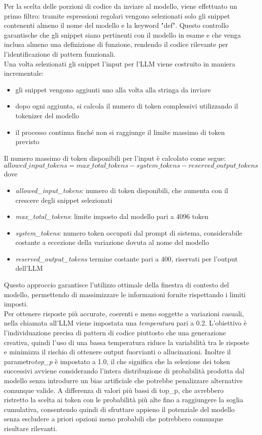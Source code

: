 \documentclass{article}
\begin{document}
Per la scelta delle porzioni di codice da inviare al modello, viene effettuato un primo filtro: tramite espressioni regolari vengono selezionati solo gli snippet contenenti almeno il nome del modello e la keyword "def". Questo controllo garantische che gli snippet siano pertinenti con il modello in esame e che venga inclusa almeno una definizione di funzione, rendendo il codice rilevante per l'identificazione di pattern funzionali.\\
Una volta selezionati gli snippet l'input per l'LLM viene costruito in maniera incrementale:
\begin{itemize}
    \item gli snippet vengono aggiunti uno alla volta alla stringa da inviare
    \item dopo ogni aggiunta, si calcola il numero di token complessivi utilizzando il tokenizer del modello
    \item il processo continua finché non si raggiunge il limite massimo di token previsto
\end{itemize}
Il numero massimo di token disponibili per l’input è calcolato come segue:
\[
allowed\_input\_tokens = max\_total\_tokens - system\_tokens - reserved\_output\_tokens
\]
dove
\begin{itemize}
    \item \textit{allowed\_input\_tokens}: numero di token disponibili, che aumenta con il crescere degli snippet selezionati
    \item \textit{max\_total\_tokens}: limite imposto dal modello pari a 4096 token
    \item \textit{system\_tokens}: numero token occupati dal prompt di sistema, considerabile costante a eccezione della variazione dovuta al nome del modello
    \item \textit{reserved\_output\_tokens} termine costante pari a 400,  riservati per l’output dell’LLM
\end{itemize}
Questo approccio garantisce l'utilizzo ottimale della finestra di contesto del modello, permettendo di massimizzare le informazioni fornite rispettando i limiti imposti.\\
Per ottenere risposte più accurate, coerenti e meno soggette a variazioni casuali, nella chiamata all'LLM viene impostata una \textit{temperatura} pari a 0.2. L'obiettivo è l’individuazione precisa di pattern di codice piuttosto che una generazione creativa, quindi l'uso di una bassa temperatura riduce la variabilità tra le risposte e minimizza il rischio di ottenere output fuorvianti o allucinazioni. Inoltre il parametro\textit{top\_p} è impostato a 1.0, il che significa che la selezione dei token successivi avviene considerando l'intera distribuzione di probabilità prodotta dal modello senza introdurre un bias artificiale che potrebbe penalizzare alternative comunque valide. A differenza di valori più bassi di top\_p, che avrebbero ristretto la scelta ai token con le probabilità più alte fino a raggiungere la soglia cumulativa, consentendo quindi di sfruttare appieno il potenziale del modello senza escludere a priori opzioni meno probabili che potrebbero comunque risultare rilevanti.\\
\end{document}
